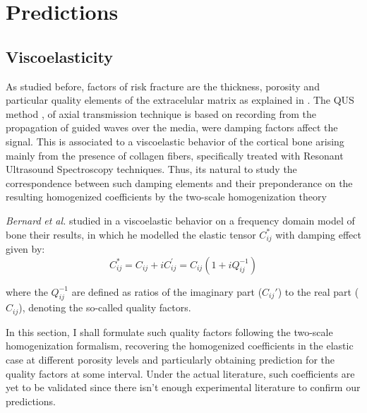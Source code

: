 \chapter{Predictions}
\section{Viscoelasticity}
As studied before, factors of risk fracture are the thickness, porosity and particular quality elements of the extracelular matrix as explained in \cite{Bernard2015}. The QUS method \cite{Foiret2014}, \cite{Minonzio2018} of axial transmission technique is based on recording from the propagation of guided waves over the media, were damping factors affect the signal. This is associated to a viscoelastic behavior of the cortical bone arising mainly from the presence of collagen fibers, specifically treated with Resonant Ultrasound Spectroscopy techniques. Thus, its natural to study the correspondence between such damping elements and their preponderance on the resulting homogenized coefficients by the two-scale homogenization theory

\textit{Bernard} \textit{et al. }\cite{Bernard2015} studied in a viscoelastic behavior on a frequency domain model of bone their results, in which he modelled the elastic tensor $C^*_{ij}$ with damping effect given by:
\begin{equation*}
C^*_{ij} = C_{ij} + i C_{ij}^{'} = C_{ij} (1+ iQ_{ij}^{-1})
\end{equation*}

where the $Q^{-1}_{ij}$ are defined as ratios of the imaginary part ($C_{ij}'$) to the real part ($C_{ij}$), denoting the so-called quality factors.

In this section, I shall formulate such quality factors following the two-scale homogenization formalism, recovering the homogenized coefficients in the elastic case at different porosity levels and particularly obtaining prediction for the quality factors at some interval. Under the actual literature, such coefficients are yet to be validated since there isn't enough experimental literature to confirm our predictions.


